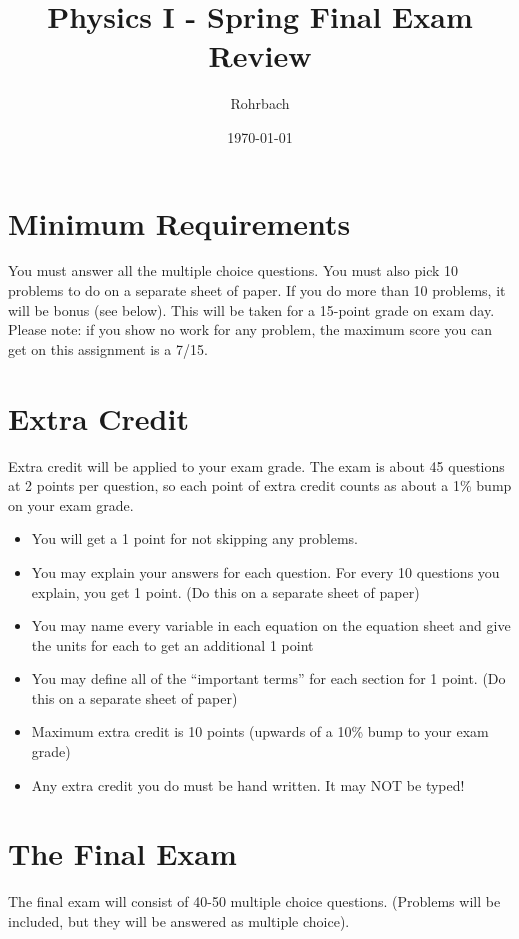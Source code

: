 \documentclass[10pt]{exam}
\title{Physics I - Spring Final Exam Review}
\author{Rohrbach}
\date{\today}
\begin{document}
\maketitle

\section*{Minimum Requirements}

You must answer all the multiple choice questions.  You must also pick 10 problems to do on a separate sheet of paper.  If you do more than 10 problems, it will be bonus (see below).  This will be taken for a 15-point grade on exam day.  Please note: if you show no work for any problem, the maximum score you can get on this assignment is a 7/15.

\section*{Extra Credit}

Extra credit will be applied to your exam grade.  The exam is about 45 questions at 2 points per question, so each point of extra credit counts as about a 1\% bump on your exam grade.

\begin{itemize}
  \item You will get a 1 point for not skipping any problems.
	\item You may explain your answers for each question.  For every 10 questions you explain, you get 1 point.  (Do this on a separate sheet of paper)
	\item You may name every variable in each equation on the equation sheet and give the units for each to get an additional 1 point
	\item You may define all of the ``important terms'' for each section for 1 point. (Do this on a separate sheet of paper)
	\item Maximum extra credit is 10 points (upwards of a 10\% bump to your exam grade)
	\item Any extra credit you do must be hand written.  It may NOT be typed!
\end{itemize}

\section*{The Final Exam}

The final exam will consist of 40-50 multiple choice questions.  (Problems will be included, but they will be answered as multiple choice).
\end{document}
